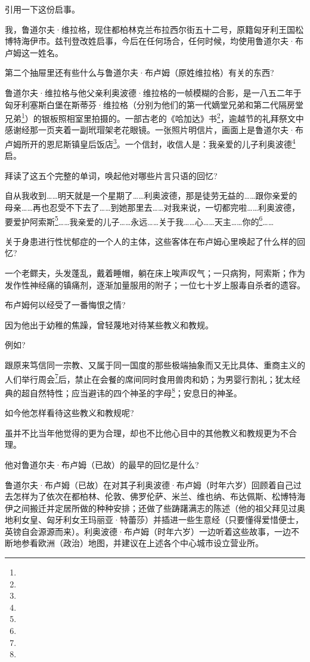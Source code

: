 \par 引用一下这份启事。
\par 我，鲁道尔夫·维拉格，现住都柏林克兰布拉西尔街五十二号，原籍匈牙利王国松博特海伊市。兹刊登改姓启事，今后在任何场合，任何时候，均使用鲁道尔夫·布卢姆这一姓名。
\par 第二个抽屉里还有些什么与鲁道尔夫·布卢姆（原姓维拉格）有关的东西?
\par 鲁道尔夫·维拉格与他父亲利奥波德·维拉格的一帧模糊的合影，是一八五二年于匈牙利塞斯白堡在斯蒂芬·维拉格（分别为他们的第一代嫡堂兄弟和第二代隔房堂兄弟\footnote{}）的银板照相室里拍摄的。一部古老的《哈加达》书\footnote{}，逾越节的礼拜祭文中感谢经那一页夹着一副玳瑁架老花眼镜。一张照片明信片，画面上是鲁道尔夫·布卢姆所开的恩尼斯镇皇后饭店\footnote{}。一个信封，收信人是：我亲爱的儿子利奥波德\footnote{}启。
\par 拜读了这五个完整的单词，唤起他对哪些片言只语的回忆?
\par 自从我收到……明天就是一个星期了……利奥波德，那是徒劳无益的……跟你亲爱的母亲……再也忍受不下去了……到她那里去……对我来说，一切都完啦……利奥波德，要爱护阿索斯\footnote{}……我亲爱的儿子……永远……关于我……心……天主……你的\footnote{}……
\par 关于身患进行性忧郁症的一个人的主体，这些客体在布卢姆心里唤起了什么样的回忆?
\par 一个老鳏夫，头发蓬乱，戴着睡帽，躺在床上唉声叹气；一只病狗，阿索斯；作为发作性神经痛的镇痛剂，逐渐加量服用的附子；一位七十岁上服毒自杀者的遗容。
\par 布卢姆何以经受了一番悔恨之情?
\par 因为他出于幼稚的焦躁，曾轻蔑地对待某些教义和教规。
\par 例如?
\par 跟原来笃信同一宗教、又属于同一国度的那些极端抽象而又无比具体、重商主义的人们举行周会\footnote{}后，禁止在会餐的席间同时食用兽肉和奶；为男婴行割礼；犹太经典的超自然特性；应当避讳的四个神圣的字母\footnote{}；安息日的神圣。
\par 如今他怎样看待这些教义和教规呢?
\par 虽并不比当年他觉得的更为合理，却也不比他心目中的其他教义和教规更为不合理。
\par 他对鲁道尔夫·布卢姆（已故）的最早的回忆是什么?
\par 鲁道尔夫·布卢姆（已故）在对其子利奥波德·布卢姆（时年六岁）回顾着自己过去怎样为了依次在都柏林、伦敦、佛罗伦萨、米兰、维也纳、布达佩斯、松博特海伊之间搬迁并定居所做的种种安排；还做了些踌躇满志的陈述（他的祖父拜见过奥地利女皇、匈牙利女王玛丽亚·特蕾莎）并插进一些生意经（只要懂得爱惜便士，英镑自会源源而来）。利奥波德·布卢姆（时年六岁）一边听着这些故事，一边不断地参看欧洲（政治）地图，并建议在上述各个中心城市设立营业所。
